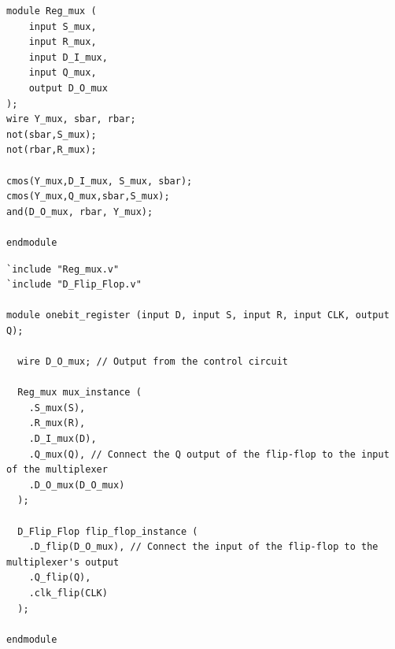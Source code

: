 \begin{lstlisting}[style=verilogStyle, caption=Register control circuit in Verilog, label=verilog_regmux]
module Reg_mux (
    input S_mux,
    input R_mux,
    input D_I_mux,
    input Q_mux,
    output D_O_mux
);			  
wire Y_mux, sbar, rbar;	
not(sbar,S_mux);
not(rbar,R_mux); 

cmos(Y_mux,D_I_mux, S_mux, sbar);
cmos(Y_mux,Q_mux,sbar,S_mux);
and(D_O_mux, rbar, Y_mux);

endmodule
\end{lstlisting}


\begin{lstlisting}[style=verilogStyle, caption=One-bit register in Verilog, label=verilog_onebitregister]
`include "Reg_mux.v"
`include "D_Flip_Flop.v"

module onebit_register (input D, input S, input R, input CLK, output Q);

  wire D_O_mux; // Output from the control circuit

  Reg_mux mux_instance (
    .S_mux(S),
    .R_mux(R),
    .D_I_mux(D), 
    .Q_mux(Q), // Connect the Q output of the flip-flop to the input of the multiplexer  
    .D_O_mux(D_O_mux)
  );

  D_Flip_Flop flip_flop_instance (
    .D_flip(D_O_mux), // Connect the input of the flip-flop to the multiplexer's output
    .Q_flip(Q),
    .clk_flip(CLK)
  );

endmodule
\end{lstlisting}


